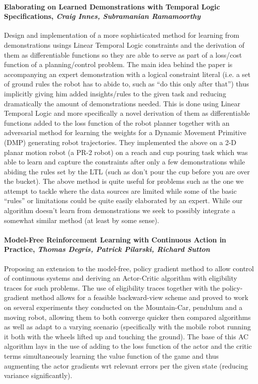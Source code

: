 \documentclass[a4paper,11pt]{article}
\begin{document}
\paragraph{Elaborating on Learned Demonstrations with Temporal Logic Specifications, \textit{Craig Innes, Subramanian Ramamoorthy}} \cite{innes2020elaborating}

Design and implementation of a more sophisticated method for learning from demonstrations usings Linear Temporal Logic constraints and the derivation of them as differentiable functions so they are able to serve as part of a loss/cost function of a planning/control problem. The main idea behind the paper is accompanying an expert demonstration with a logical constraint literal (i.e. a set of ground rules the robot has to abide to, such as “do this only after that”) thus implicitly giving him added insights/rules to the given task and reducing dramatically the amount of demonstrations needed. This is done using Linear Temporal Logic and more specifically a novel derivation of them as differentiable functions added to the loss function of the robot planner together with an adversarial method for learning the weights for a Dynamic Movement Primitive (DMP) generating robot trajectories. They implemented the above on a 2-D planar motion robot (a PR-2 robot) on a reach and cup pouring task which was able to learn and capture the constraints after only a few demonstrations while abiding the rules set by the LTL (such as don’t pour the cup before you are over the bucket). The above method is quite useful for problems such as the one we attempt to tackle where the data sources are limited while some of the basic “rules” or limitations could be quite easily elaborated by an expert. While our algorithm doesn’t learn from demonstrations we seek to possibly integrate a somewhat similar method (at least by some sense).

\paragraph{Model-Free Reinforcement Learning with Continuous Action in Practice, 
\textit{Thomas Degris, Patrick Pilarski, Richard Sutton}} \cite{degris2012model}
Proposing an extension to the model-free, policy gradient method to allow control of continuous systems and deriving an Actor-Critic algorithm with eligibility traces for such problems. The use of eligibility traces together with the policy-gradient method allows for a feasible backward-view scheme and proved to work on several experiments they conducted on the Mountain-Car, pendulum and a moving  robot, allowing them to both converge quicker then compared algorithms as well as adapt to a varying scenario (specifically with the mobile robot running it both with the wheels lifted up and touching the ground). The base of this AC algorithm lays in the use of adding to the loss function of the actor and the critic terms simultaneously learning the value function of the game and thus augmenting the actor gradients wrt relevant errors per the given state (reducing variance significantly). 
\end{document}
